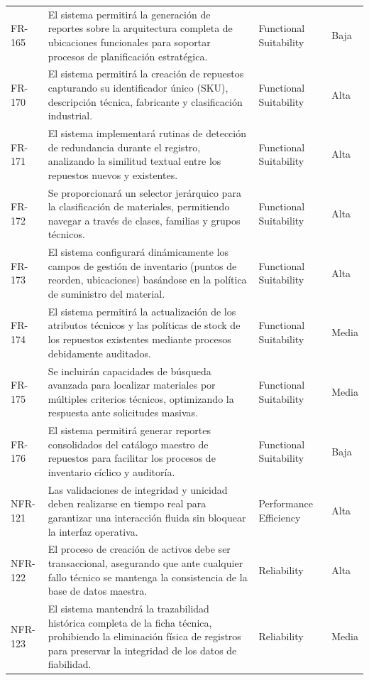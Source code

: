 \begin{longtable}{>{\raggedright\arraybackslash}p{} >{\raggedright\arraybackslash}p{} >{\raggedright\arraybackslash}p{} >{\raggedright\arraybackslash}p{}}
FR-165 & El sistema permitirá la generación de reportes sobre la arquitectura completa de ubicaciones funcionales para soportar procesos de planificación estratégica. & Functional Suitability & Baja \\
FR-170 & El sistema permitirá la creación de repuestos capturando su identificador único (SKU), descripción técnica, fabricante y clasificación industrial. & Functional Suitability & Alta \\
FR-171 & El sistema implementará rutinas de detección de redundancia durante el registro, analizando la similitud textual entre los repuestos nuevos y existentes. & Functional Suitability & Alta \\
FR-172 & Se proporcionará un selector jerárquico para la clasificación de materiales, permitiendo navegar a través de clases, familias y grupos técnicos. & Functional Suitability & Alta \\
FR-173 & El sistema configurará dinámicamente los campos de gestión de inventario (puntos de reorden, ubicaciones) basándose en la política de suministro del material. & Functional Suitability & Alta \\
FR-174 & El sistema permitirá la actualización de los atributos técnicos y las políticas de stock de los repuestos existentes mediante procesos debidamente auditados. & Functional Suitability & Media \\
FR-175 & Se incluirán capacidades de búsqueda avanzada para localizar materiales por múltiples criterios técnicos, optimizando la respuesta ante solicitudes masivas. & Functional Suitability & Media \\
FR-176 & El sistema permitirá generar reportes consolidados del catálogo maestro de repuestos para facilitar los procesos de inventario cíclico y auditoría. & Functional Suitability & Baja \\
NFR-121 & Las validaciones de integridad y unicidad deben realizarse en tiempo real para garantizar una interacción fluida sin bloquear la interfaz operativa. & Performance Efficiency & Alta \\
NFR-122 & El proceso de creación de activos debe ser transaccional, asegurando que ante cualquier fallo técnico se mantenga la consistencia de la base de datos maestra. & Reliability & Alta \\
NFR-123 & El sistema mantendrá la trazabilidad histórica completa de la ficha técnica, prohibiendo la eliminación física de registros para preservar la integridad de los datos de fiabilidad. & Reliability & Media \\

\end{longtable}
